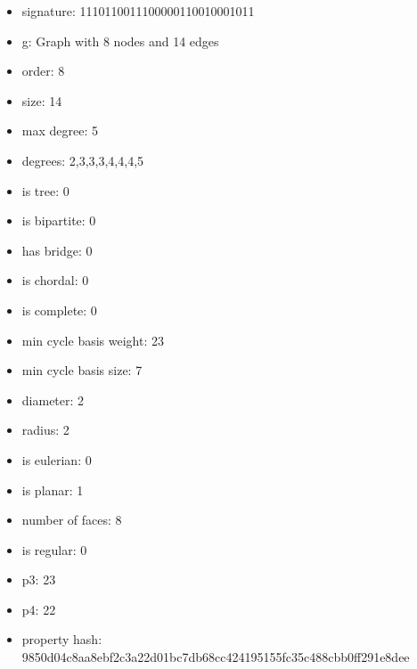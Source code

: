 \begin{itemize}
\item signature: 1110110011100000110010001011
\item g: Graph with 8 nodes and 14 edges
\item order: 8
\item size: 14
\item max degree: 5
\item degrees: 2,3,3,3,4,4,4,5
\item is tree: 0
\item is bipartite: 0
\item has bridge: 0
\item is chordal: 0
\item is complete: 0
\item min cycle basis weight: 23
\item min cycle basis size: 7
\item diameter: 2
\item radius: 2
\item is eulerian: 0
\item is planar: 1
\item number of faces: 8
\item is regular: 0
\item p3: 23
\item p4: 22
\item property hash: 9850d04c8aa8ebf2c3a22d01bc7db68cc424195155fc35c488cbb0ff291e8dee
\end{itemize}
\newpage
\begin{figure}
\end{figure}
